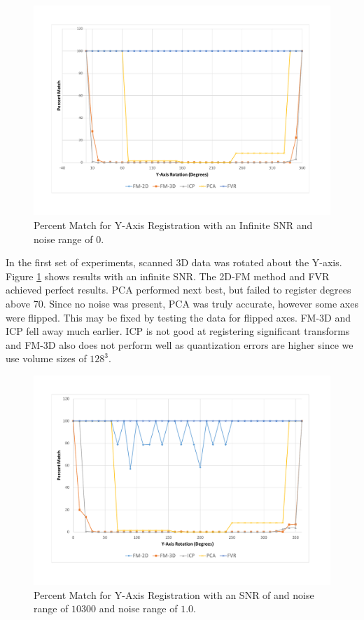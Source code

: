 \begin{figure}[t]
\centering
\includegraphics[width=6.0in]{images/results/noise/YRNoise0}
\caption{Percent Match for Y-Axis Registration with an Infinite SNR and noise range of $0$.}
\label{fig:YRNoise0}
\end{figure}

In the first set of experiments, scanned 3D data was rotated about the Y-axis. Figure \ref{fig:YRNoise0} shows results with an infinite SNR. The 2D-FM method and FVR achieved perfect results. PCA performed next best, but failed to register degrees above 70. Since no noise was present, PCA was truly accurate, however some axes were flipped. This may be fixed by testing the data for flipped axes. FM-3D and ICP fell away much earlier. ICP is not good at registering significant transforms and FM-3D also does not perform well as quantization errors are higher since we use volume sizes of $128^3$.

\begin{figure}[t]
\centering
\includegraphics[width=6.0in]{images/results/noise/YRNoise1}
\caption{Percent Match for Y-Axis Registration with an SNR of and noise range of $10300$ and noise range of $1.0$.}
\label{fig:YRNoise1}
\end{figure}

